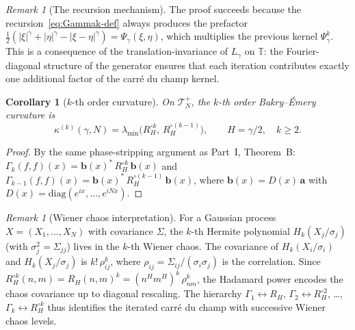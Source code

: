 \documentclass[11pt,a4paper]{article}
\theoremstyle{plain}
\newtheorem{corollary}[theorem]{Corollary}
\theoremstyle{definition}
\theoremstyle{remark}
\newtheorem{remark}[theorem]{Remark}
\newcommand{\T}{\mathbb{T}}
\begin{document}
\begin{remark}[The recursion mechanism]\label{rem:recursion}
The proof succeeds because the recursion~\eqref{eq:Gammak-def}
always produces the prefactor
$\frac{1}{2}(|\xi|^\gamma + |\eta|^\gamma - |\xi-\eta|^\gamma)
= \Psi_\gamma(\xi,\eta)$,
which multiplies the previous kernel $\Psi_\gamma^k$.
This is a consequence of the translation-invariance of
$L_\gamma$ on $\T$: the Fourier-diagonal structure of the
generator ensures that each iteration contributes exactly one
additional factor of the carr\'e du champ kernel.
\end{remark}

\begin{corollary}[$k$-th order curvature]\label{cor:kth-curvature}
On $\mathcal{T}_N^+$, the $k$-th order Bakry--\'Emery curvature is
\begin{equation}\label{eq:kappak}
  \kappa^{(k)}(\gamma,N)
  = \lambda_{\min}\!\bigl(R_H^{\circ k},\, R_H^{\circ(k-1)}\bigr),
  \qquad H = \gamma/2, \quad k \geq 2.
\end{equation}
\end{corollary}

\begin{proof}
By the same phase-stripping argument as Part~I, Theorem~B:
$\Gamma_k(f,f)(x) = \mathbf{b}(x)^*\,R_H^{\circ k}\,\mathbf{b}(x)$
and
$\Gamma_{k-1}(f,f)(x) = \mathbf{b}(x)^*\,R_H^{\circ(k-1)}\,\mathbf{b}(x)$,
where $\mathbf{b}(x) = D(x)\,\mathbf{a}$ with
$D(x) = \mathrm{diag}(e^{ix},\ldots,e^{iNx})$.
\end{proof}

\begin{remark}[Wiener chaos interpretation]\label{rem:chaos}
For a Gaussian process $X = (X_1,\ldots,X_N)$ with covariance
$\Sigma$, the $k$-th Hermite polynomial $H_k(X_j/\sigma_j)$
(with $\sigma_j^2 = \Sigma_{jj}$) lives in the $k$-th Wiener
chaos. The covariance of $H_k(X_i/\sigma_i)$ and $H_k(X_j/\sigma_j)$
is $k!\,\rho_{ij}^k$, where $\rho_{ij} = \Sigma_{ij}/(\sigma_i\sigma_j)$
is the correlation.
Since $R_H^{\circ k}(n,m) = R_H(n,m)^k = (n^H m^H)^k\,\rho_{nm}^k$,
the Hadamard power encodes the chaos covariance up to
diagonal rescaling.
The hierarchy
$\Gamma_1 \leftrightarrow R_H$,
$\Gamma_2 \leftrightarrow R_H^{\circ 2}$, \ldots,
$\Gamma_k \leftrightarrow R_H^{\circ k}$
thus identifies the iterated carr\'e du champ with
successive Wiener chaos levels.
\end{remark}


\end{document}
